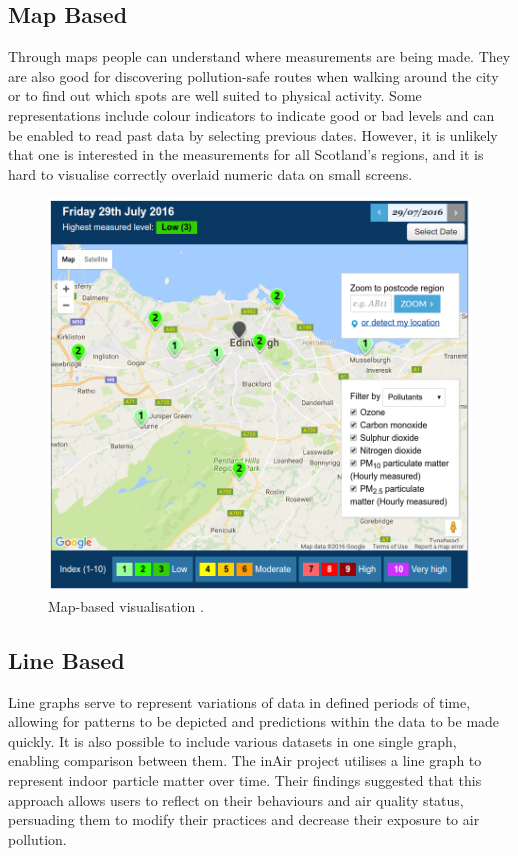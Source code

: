 \subsection{Map Based}
Through maps people can understand where measurements are being made. They are also good for discovering pollution-safe routes when walking around the city or to find out which spots are well suited to physical activity.  Some representations include colour indicators to indicate good or bad levels and can be enabled to read past data by selecting previous dates. However, it is unlikely that one is interested in the measurements for all Scotland's regions, and it is hard to visualise correctly overlaid numeric data on small screens.

\begin{figure}[H]
\begin{adjustbox}{width=1\textwidth,center=\textwidth}
  \centering
  \includegraphics[scale=.30]{images/map_visualization.png}
\end{adjustbox}
  \caption[Map-based visualisation]{Map-based visualisation \cite{Scottishairquality.co.uk2016}.}
  \label{fig:web_based_desktop_visualization}
\end{figure}


\subsection{Line Based}
Line graphs serve to represent variations of data in defined periods of time, allowing for patterns to be depicted and predictions within the data to be made quickly. It is also possible to include various datasets in one single graph, enabling comparison between them. The inAir project \cite{Kim2013} utilises a line graph to represent indoor particle matter over time. Their findings suggested that this approach allows users to reflect on their behaviours and air quality status, persuading them to modify their practices and decrease their exposure to air pollution. 

